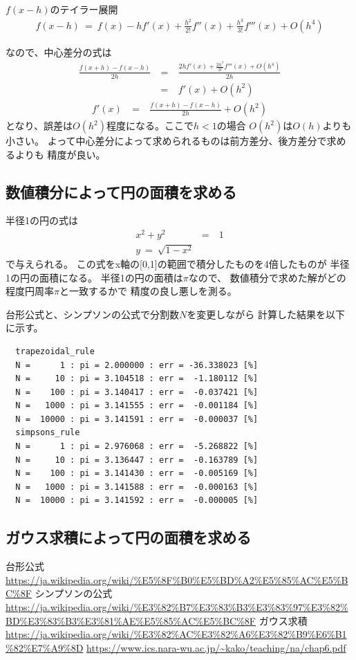 \documentclass[dvipdfmx]{jsarticle}
\begin{document}
$f(x-h)のテイラー展開$
\begin{eqnarray}
  f(x-h) ~=~ f(x)-hf'(x)+\frac{h^2}{2!}f''(x)+\frac{h^3}{3!}f'''(x)+O(h^4) \nonumber
\end{eqnarray}

なので、中心差分の式は
\begin{eqnarray}
  \frac{f(x+h)-f(x-h)}{2h} ~&=&~ \frac{2hf'(x)+\frac{2h^3}{3!}f'''(x)+O(h^4)}{2h}\nonumber\\
  &=&~ f'(x)+O(h^2)\nonumber
\end{eqnarray}
\begin{eqnarray}
  f'(x) ~&=&~ \frac{f(x+h)-f(x-h)}{2h}+O(h^2)
\end{eqnarray}
となり、誤差は$O(h^2)$程度になる。ここで$h<1$の場合
$O(h^2)$は$O(h)$よりも小さい。
よって中心差分によって求められるものは前方差分、後方差分で求めるよりも
精度が良い。


\subsection{数値積分によって円の面積を求める}

半径1の円の式は
\begin{eqnarray}
  x^2+y^2 ~&=&~ 1 \nonumber\\
  y ~=~ \sqrt{1-x^2}
\end{eqnarray}
で与えられる。
この式をx軸の[0,1]の範囲で積分したものを4倍したものが
半径1の円の面積になる。
半径1の円の面積は$\pi$なので、
数値積分で求めた解がどの程度円周率$\pi$と一致するかで
精度の良し悪しを測る。

台形公式と、シンプソンの公式で分割数$N$を変更しながら
計算した結果を以下に示す。
\begin{verbatim}
  trapezoidal_rule
  N =      1 : pi = 2.000000 : err = -36.338023 [%]
  N =     10 : pi = 3.104518 : err =  -1.180112 [%]
  N =    100 : pi = 3.140417 : err =  -0.037421 [%]
  N =   1000 : pi = 3.141555 : err =  -0.001184 [%]
  N =  10000 : pi = 3.141591 : err =  -0.000037 [%]
  simpsons_rule
  N =      1 : pi = 2.976068 : err =  -5.268822 [%]
  N =     10 : pi = 3.136447 : err =  -0.163789 [%]
  N =    100 : pi = 3.141430 : err =  -0.005169 [%]
  N =   1000 : pi = 3.141588 : err =  -0.000163 [%]
  N =  10000 : pi = 3.141592 : err =  -0.000005 [%]
\end{verbatim}



\subsection{ガウス求積によって円の面積を求める}


\begin{thebibliography}{10}
   台形公式
  \url{https://ja.wikipedia.org/wiki/%E5%8F%B0%E5%BD%A2%E5%85%AC%E5%BC%8F}
   シンプソンの公式
  \url{https://ja.wikipedia.org/wiki/%E3%82%B7%E3%83%B3%E3%83%97%E3%82%BD%E3%83%B3%E3%81%AE%E5%85%AC%E5%BC%8F}
   ガウス求積
  \url{https://ja.wikipedia.org/wiki/%E3%82%AC%E3%82%A6%E3%82%B9%E6%B1%82%E7%A9%8D}
  \url{https://www.ics.nara-wu.ac.jp/~kako/teaching/na/chap6.pdf}

\end{thebibliography}
\end{document}
